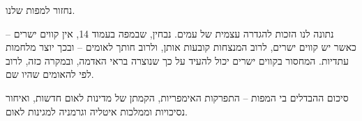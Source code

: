 \documentclass[]{article}
\begin{document}
	נחזור למפות שלנו. 
	
	נתונה לנו הזכות להגדרה עצמית של עמים. נבחין, שבמפה בעמוד 14, אין קווים ישרים – כאשר יש קווים ישרים, לרוב המנצחות קובעות אותן, ולרוב חותך לאומים – ובכך יוצר מלחמות עתדיות. המחסור בקווים ישרים יכול להעיד על כך שנוצרה בראי האדמה, ובמקרה כזה, לרוב לפי להאומים שהיו שם. 
	
	סיכום ההבדלים בי המפות – התפרקות האימפריות, הקמתן של מדינות לאום חדשות, ואיחור נסיכויות וממלכות איטליה וגרמניה למגינות לאום. 
	
	
	
	
\end{document}
